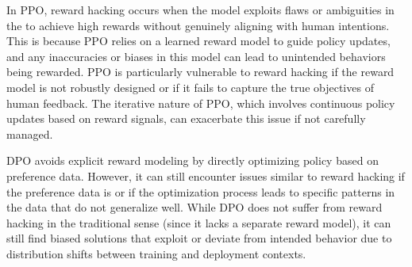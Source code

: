 \documentclass[letterpaper,11pt,english]{sphinxmanual}
\begin{document}
\sphinxAtStartPar
In PPO, reward hacking occurs when the model exploits flaws or
ambiguities in the  to achieve high rewards without
genuinely aligning with human intentions. This is because PPO relies on
a learned reward model to guide policy updates, and any inaccuracies or
biases in this model can lead to unintended behaviors being rewarded.
PPO is particularly vulnerable to reward hacking if the reward model is
not robustly designed or if it fails to capture the true objectives of
human feedback. The iterative nature of PPO, which involves continuous
policy updates based on reward signals, can exacerbate this issue if not
carefully managed.

\sphinxAtStartPar
DPO avoids explicit reward modeling by directly optimizing policy based
on preference data. However, it can still encounter issues similar to
reward hacking if the preference data is  or if the
optimization process leads to  specific patterns in the
data that do not generalize well. While DPO does not suffer from reward
hacking in the traditional sense (since it lacks a separate reward
model), it can still find biased solutions that exploit
 or deviate from intended behavior due
to distribution shifts between training and deployment contexts.
\end{document}

